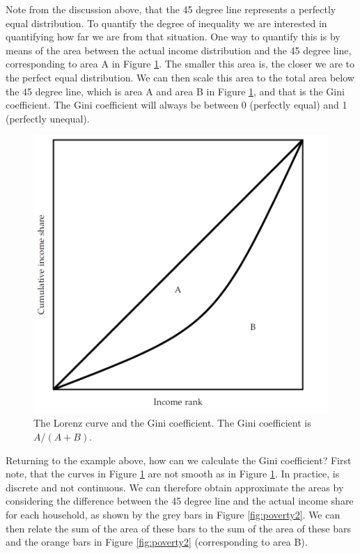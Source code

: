 \documentclass[]{book}
\begin{document}
Note from the discussion above, that the 45 degree line represents a perfectly equal distribution. To quantify the degree of inequality we are interested in quantifying how far we are from that situation. One way to quantify this is by means of the area between the actual income distribution and the 45 degree line, corresponding to area A in Figure \ref{fig:poverty1}. The smaller this area is, the closer we are to the perfect equal distribution. We can then scale this area to the total area below the 45 degree line, which is area A and area B in Figure \ref{fig:poverty1}, and that is the Gini coefficient. The Gini coefficient will always be between 0 (perfectly equal) and 1 (perfectly unequal).

\begin{figure}

{\centering \includegraphics[width=0.65\linewidth]{_resources/chapter_inequality/tikz} 

}

\caption{The Lorenz curve and the Gini coefficient. The Gini coefficient is $A/(A+B)$.}\label{fig:poverty1}
\end{figure}

Returning to the example above, how can we calculate the Gini coefficient? First note, that the curves in Figure \ref{fig:poverty1} are not smooth as in Figure \ref{fig:poverty1}. In practice, is discrete and not continuous. We can therefore obtain approximate the areas by considering the difference between the 45 degree line and the actual income share for each household, as shown by the grey bars in Figure \ref{fig:poverty2}. We can then relate the sum of the area of these bars to the sum of the area of these bars and the orange bars in Figure \ref{fig:poverty2} (corresponding to area B).
\end{document}
